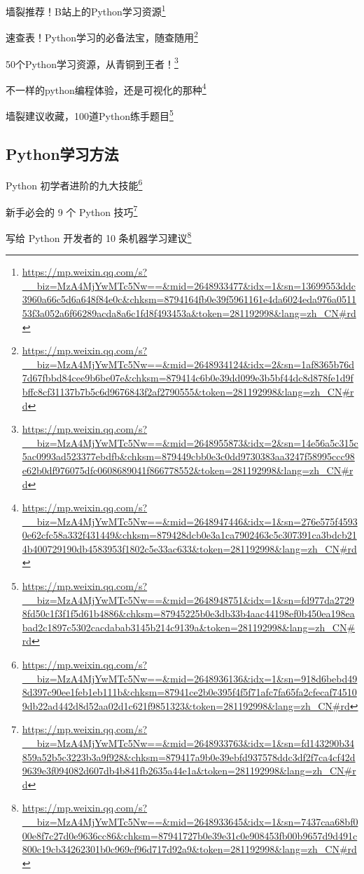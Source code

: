 \documentclass[]{ctexbook}
\renewcommand{\href}[2]{#2\footnote{\url{#1}}}
\begin{document}
\href{https://mp.weixin.qq.com/s?__biz=MzA4MjYwMTc5Nw==\&mid=2648933477\&idx=1\&sn=13699553ddc3960a66c5d6a648f84e0c\&chksm=8794164fb0e39f5961161e4da6024eda976a051153f3a052a6f66289acda8a6c1fd8f493453a\&token=281192998\&lang=zh_CN\#rd}{墙裂推荐！B站上的Python学习资源}

\href{https://mp.weixin.qq.com/s?__biz=MzA4MjYwMTc5Nw==\&mid=2648934124\&idx=2\&sn=1af8365b76d7d67fbbd84cee9b6be07e\&chksm=879414c6b0e39dd099e3b5bf44dc8d878fe1d9fbffc8cf31137b7b5c6d9676843f2af2790555\&token=281192998\&lang=zh_CN\#rd}{速查表！Python学习的必备法宝，随查随用}

\href{https://mp.weixin.qq.com/s?__biz=MzA4MjYwMTc5Nw==\&mid=2648955873\&idx=2\&sn=14e56a5c315c5ac0993ad523377ebdfb\&chksm=879449cbb0e3c0dd9730383aa3247f58995ccc98e62b0df976075dfc0608689041f866778552\&token=281192998\&lang=zh_CN\#rd}{50个Python学习资源，从青铜到王者！}

\href{https://mp.weixin.qq.com/s?__biz=MzA4MjYwMTc5Nw==\&mid=2648947446\&idx=1\&sn=276e575f45930e62cfc58a332f431449\&chksm=879428dcb0e3a1ca7902463c5c307391ca3bdcb214b400729190db4583953f1802c5e33ac633\&token=281192998\&lang=zh_CN\#rd}{不一样的python编程体验，还是可视化的那种}

\href{https://mp.weixin.qq.com/s?__biz=MzA4MjYwMTc5Nw==\&mid=2648948751\&idx=1\&sn=fd977da27298fd50c1f3f1f5d61b4886\&chksm=87945225b0e3db33b4aac44198ef0b450ea198eabad2c1897c5302cacdabab3145b214c9139a\&token=281192998\&lang=zh_CN\#rd}{墙裂建议收藏，100道Python练手题目}

\hypertarget{pythonux5b66ux4e60ux65b9ux6cd5}{%
\subsection{Python学习方法}\label{pythonux5b66ux4e60ux65b9ux6cd5}}

\href{https://mp.weixin.qq.com/s?__biz=MzA4MjYwMTc5Nw==\&mid=2648936136\&idx=1\&sn=918d6bebd498d397c90ee1feb1eb111b\&chksm=87941ce2b0e395f4f5f71afc7fa65fa2cfecaf745109db22ad442d8d52aa02d1c621f9851323\&token=281192998\&lang=zh_CN\#rd}{Python 初学者进阶的九大技能}

\href{https://mp.weixin.qq.com/s?__biz=MzA4MjYwMTc5Nw==\&mid=2648933763\&idx=1\&sn=fd143290b34859a52b5c3223b3a9f928\&chksm=879417a9b0e39ebfd937578ddc3df2f7ca4cf42d9639e3f094082d607db4b841fb2635a44e1a\&token=281192998\&lang=zh_CN\#rd}{新手必会的 9 个 Python 技巧}

\href{https://mp.weixin.qq.com/s?__biz=MzA4MjYwMTc5Nw==\&mid=2648933645\&idx=1\&sn=7437caa68bf000e8f7c27d0e9636cc86\&chksm=87941727b0e39e31c0e908453fb00b9657d9d491c800c19cb34262301b0c969cf96d717d92a9\&token=281192998\&lang=zh_CN\#rd}{写给 Python 开发者的 10 条机器学习建议}
\end{document}
